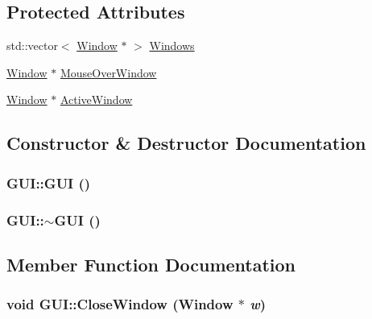 \subsection*{Protected Attributes}
\begin{CompactItemize}
\item 
std::vector$<$ \hyperlink{class_window}{Window} $\ast$ $>$ \hyperlink{class_g_u_i_cf6ff30e45106fbc8cc363cc7a8f5234}{Windows}
\item 
\hyperlink{class_window}{Window} $\ast$ \hyperlink{class_g_u_i_88c450e5cfd3288d0734b7c00a156916}{MouseOverWindow}
\item 
\hyperlink{class_window}{Window} $\ast$ \hyperlink{class_g_u_i_5dafa13d6ffc527b38a4b44070614096}{ActiveWindow}
\end{CompactItemize}


\subsection{Constructor \& Destructor Documentation}
\hypertarget{class_g_u_i_8cbb3140b7d3c9d8e942d6ce6b60a0e8}{
\subsubsection[{GUI}]{\setlength{\rightskip}{0pt plus 5cm}GUI::GUI ()}}
\label{class_g_u_i_8cbb3140b7d3c9d8e942d6ce6b60a0e8}


\hypertarget{class_g_u_i_c9cae2328dcb5d83bdfaeca49a2eb695}{
\subsubsection[{$\sim$GUI}]{\setlength{\rightskip}{0pt plus 5cm}GUI::$\sim$GUI ()}}
\label{class_g_u_i_c9cae2328dcb5d83bdfaeca49a2eb695}




\subsection{Member Function Documentation}
\hypertarget{class_g_u_i_6312d42b33f2a747380e11b63c25e838}{
\subsubsection[{CloseWindow}]{\setlength{\rightskip}{0pt plus 5cm}void GUI::CloseWindow ({\bf Window} $\ast$ {\em w})}}
\label{class_g_u_i_6312d42b33f2a747380e11b63c25e838}


